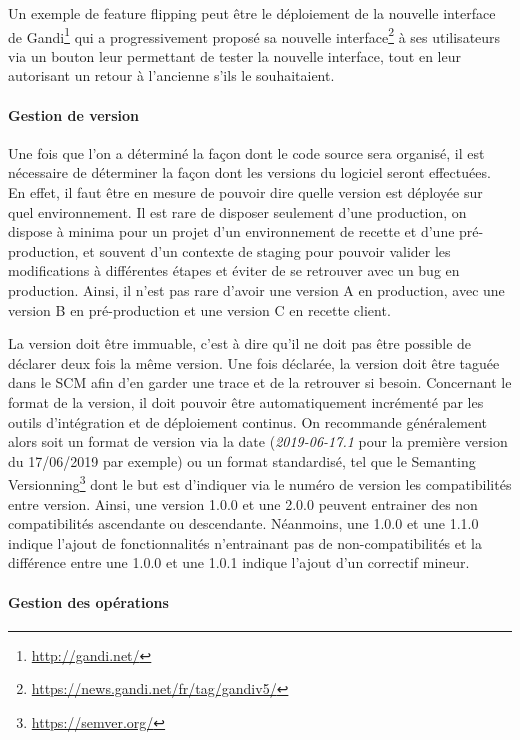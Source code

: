 Un exemple de feature flipping peut être le déploiement de la nouvelle interface de Gandi\footnote{\url{http://gandi.net/}} qui a progressivement proposé sa nouvelle interface\footnote{\url{https://news.gandi.net/fr/tag/gandiv5/}} à ses utilisateurs via un bouton leur permettant de tester la nouvelle interface, tout en leur autorisant un retour à l'ancienne s'ils le souhaitaient. 

\paragraph{Gestion de version}

Une fois que l'on a déterminé la façon dont le code source sera organisé, il est nécessaire de déterminer la façon dont les versions du logiciel seront effectuées. En effet, il faut être en mesure de pouvoir dire quelle version est déployée sur quel environnement. Il est rare de disposer seulement d'une production, on dispose à minima pour un projet d'un environnement de recette et d'une pré-production, et souvent d'un contexte de staging pour pouvoir valider les modifications à différentes étapes et éviter de se retrouver avec un bug en production. Ainsi, il n'est pas rare d'avoir une version A en production, avec une version B en pré-production et une version C en recette client.

La version doit être immuable, c'est à dire qu'il ne doit pas être possible de déclarer deux fois la même version. Une fois déclarée, la version doit être taguée dans le \gls{SCM} afin d'en garder une trace et de la retrouver si besoin. Concernant le format de la version, il doit pouvoir être automatiquement incrémenté par les outils d'intégration et de déploiement continus. On recommande généralement alors soit un format de version via la date (\emph{2019-06-17.1} pour la première version du 17/06/2019 par exemple) ou un format standardisé, tel que le Semanting Versionning\footnote{\url{https://semver.org/}} dont le but est d'indiquer via le numéro de version les compatibilités entre version. Ainsi, une version 1.0.0 et une 2.0.0 peuvent entrainer des non compatibilités ascendante ou descendante. Néanmoins, une 1.0.0 et une 1.1.0 indique l'ajout de fonctionnalités n'entrainant pas de non-compatibilités et la différence entre une 1.0.0 et une 1.0.1 indique l'ajout d'un correctif mineur.

\paragraph{Gestion des opérations}

